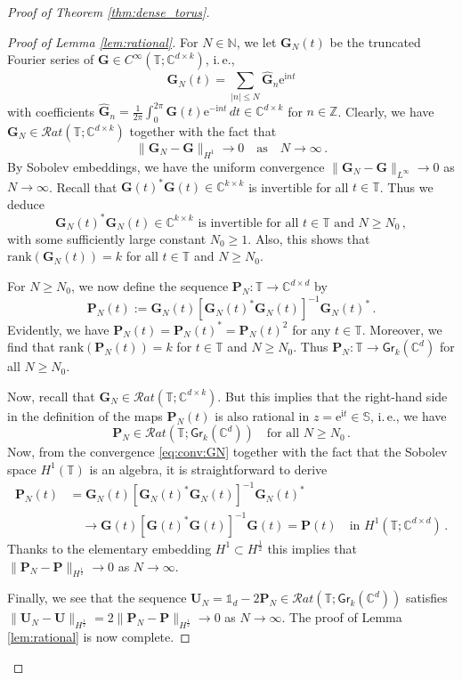\documentclass[11pt,reqno]{amsart}
\theoremstyle{definition}
\theoremstyle{remark}
\theoremstyle{remark}
\numberwithin{equation}{section}
\newcommand{\C}{\mathbb{C}}
\newcommand{\N}{\mathbb{N}}
\newcommand{\Z}{\mathbb{Z}}
\newcommand{\T}{\mathbb{T}}
\newcommand{\Ss}{\mathbb{S}}
\newcommand{\rank}{\mathrm{rank}}
\newcommand{\be}{\begin{equation}}
\newcommand{\ee}{\end{equation}}
\newcommand{\ii}{\mathrm{i}}
\newcommand{\eu}{\mathrm{e}}
\newcommand{\Ub}{\mathbf{U}}
\newcommand{\Pb}{\mathbf{P}}
\newcommand{\Gb}{\mathbf{G}}
\newcommand{\Gr}{\mathsf{Gr}}
\begin{document}
\begin{appendix}
\begin{proof}[Proof of Theorem \ref{thm:dense_torus}]
\begin{proof}[Proof of Lemma \ref{lem:rational}]
For $N \in \N$, we let $\Gb_N(t)$ be the truncated Fourier series of $\Gb \in C^\infty(\T; \C^{d \times k})$, i.\,e.,
$$
\Gb_N(t) = \sum_{|n| \leq N} \widehat{\Gb}_n \eu^{\ii n t} 
$$
with coefficients $\widehat{\Gb}_n = \frac{1}{2 \pi} \int_0^{2 \pi} \Gb(t) \eu^{-\ii n t} \, dt \in \C^{d \times k}$ for $n \in \Z$. Clearly, we have $\Gb_N \in \mathcal{R}at(\T; \C^{d \times k})$ together with the fact that
\be \label{eq:conv:GN}
\| \Gb_N - \Gb \|_{H^1} \to 0 \quad \mbox{as} \quad N \to \infty \, .
\ee
By Sobolev embeddings, we have the uniform convergence $\| \Gb_N - \Gb \|_{L^\infty} \to 0$ as $N \to \infty$. Recall that $\Gb(t)^* \Gb(t) \in \C^{k \times k}$ is invertible for all $t \in \T$. Thus we deduce 
$$
\mbox{$\Gb_N(t)^* \Gb_N(t) \in \C^{k \times k}$ is invertible for all $t \in \T$ and $N \geq N_0$} \, ,
$$
with some sufficiently large constant $N_0 \geq 1$. Also, this shows that $\rank(\Gb_N(t)) = k$ for all $t \in \T$ and $N \geq N_0$.

For $N \geq N_0$, we now define the sequence $\Pb_N : \T \to \C^{d \times d}$ by
$$
\Pb_N(t) := \Gb_N(t) [ \Gb_N(t)^* \Gb_N(t) ]^{-1} \Gb_N(t)^* \, .
$$
Evidently, we have $\Pb_N(t) = \Pb_N(t)^* = \Pb_N(t)^2$ for any $t \in \T$. Moreover, we find that $\rank (\Pb_N(t)) = k$ for $t \in \T$ and $N \geq N_0$. Thus $\Pb_N : \T \to \Gr_k(\C^d)$ for all $N \geq N_0$.

Now, recall that $\Gb_N \in \mathcal{R}at(\T; \C^{d \times k})$. But this implies that the right-hand side in the definition of the maps $\Pb_N(t)$ is also rational in $z= \eu^{\ii t} \in \Ss$, i.\,e., we have
$$
\Pb_N \in \mathcal{R}at(\T; \Gr_k(\C^d)) \quad \mbox{for all $N \geq N_0$} \, .
$$
Now, from the convergence \eqref{eq:conv:GN} together with the fact that the Sobolev space $H^1(\T)$ is an algebra, it is straightforward to derive
\begin{align*}
\Pb_N(t) & =  \Gb_N(t) [ \Gb_N(t)^* \Gb_N(t) ]^{-1} \Gb_N(t)^* \\
& \quad \to \Gb(t) [\Gb(t)^* \Gb(t)]^{-1} \Gb(t) = \Pb(t) \quad \mbox{in $H^1(\T; \C^{d \times d})$} \, .
\end{align*}
Thanks to the elementary embedding $H^{1} \subset H^{\frac 1 2}$ this implies that $\| \Pb_N - \Pb \|_{H^{\frac 1 2}} \to 0$ as $N \to \infty$. 

Finally, we see that the sequence $\Ub_N= \mathds{1}_d - 2 \Pb_N \in \mathcal{R}at(\T; \Gr_k(\C^d))$ satisfies $\| \Ub_N - \Ub \|_{H^{\frac 1 2}} = 2 \| \Pb_N - \Pb \|_{H^{\frac 1 2}} \to 0$ as $N \to \infty$. The proof of Lemma \ref{lem:rational} is now complete.
\end{proof}


\end{proof}
\end{appendix}
\end{document}
